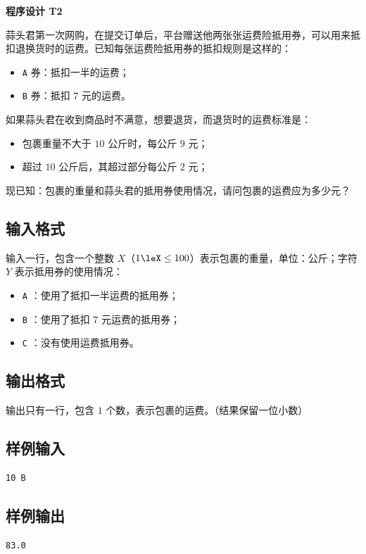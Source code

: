 \documentclass{article}
\newcommand{\problemname}[1]{\begin{center}\Large\bfseries #1\end{center}}
\begin{document}
\problemname{程序设计 T2}

蒜头君第一次网购，在提交订单后，平台赠送他两张张运费险抵用券，可以用来抵扣退换货时的运费。已知每张运费险抵用券的抵扣规则是这样的：

\begin{itemize}
  \item \texttt{A} 券：抵扣一半的运费；

  \item \texttt{B} 券：抵扣 $7$ 元的运费。

\end{itemize}
如果蒜头君在收到商品时不满意，想要退货，而退货时的运费标准是：

\begin{itemize}
  \item 包裹重量不大于 $10$ 公斤时，每公斤 $9$ 元；

  \item 超过 $10$ 公斤后，其超过部分每公斤 $2$ 元；

\end{itemize}
现已知：包裹的重量和蒜头君的抵用券使用情况，请问包裹的运费应为多少元？

\subsection*{输入格式}
输入一行，包含一个整数 $X$（$1\leX\le100$）表示包裹的重量，单位：公斤；字符 $Y$ 表示抵用券的使用情况：

\begin{itemize}
  \item \texttt{A} ：使用了抵扣一半运费的抵用券；

  \item \texttt{B} ：使用了抵扣 $7$ 元运费的抵用券；

  \item \texttt{C} ：没有使用运费抵用券。

\end{itemize}
\subsection*{输出格式}
输出只有一行，包含 $1$ 个数，表示包裹的运费。（结果保留一位小数）

\subsection*{样例输入}
\begin{verbatim}
10 B
\end{verbatim}

\subsection*{样例输出}
\begin{verbatim}
83.0
\end{verbatim}
\end{document}
